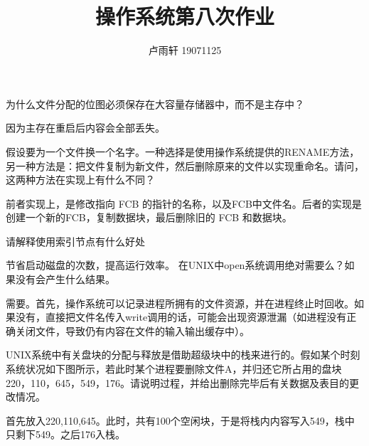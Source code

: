 \documentclass{ctexart}
\title{操作系统第八次作业}
\author{卢雨轩 19071125}
\begin{document}
\maketitle

\begin{outline}[enumerate]
    \1 为什么文件分配的位图必须保存在大容量存储器中，而不是主存中？

        因为主存在重启后内容会全部丢失。

    \1 假设要为一个文件换一个名字。一种选择是使用操作系统提供的RENAME方法，另一种方法是：把文件复制为新文件，然后删除原来的文件以实现重命名。请问，这两种方法在实现上有什么不同？ 

        前者实现上，是修改指向 FCB 的指针的名称，以及FCB中文件名。后者的实现是创建一个新的FCB，复制数据块，最后删除旧的 FCB 和数据块。

    \1 请解释使用索引节点有什么好处

        节省启动磁盘的次数，提高运行效率。
    \1 在UNIX中open系统调用绝对需要么？如果没有会产生什么结果。

        需要。首先，操作系统可以记录进程所拥有的文件资源，并在进程终止时回收。如果没有，直接把文件名传入write调用的话，可能会出现资源泄漏（如进程没有正确关闭文件，导致仍有内容在文件的输入输出缓存中）。

    \begin{minipage}[b]{0.7\textwidth}
        \1 UNIX系统中有关盘块的分配与释放是借助超级块中的栈来进行的。假如某个时刻系统状况如下图所示，若此时某个进程要删除文件A，并归还它所占用的盘块220，110，645，549，176。请说明过程，并给出删除完毕后有关数据及表目的更改情况。

        首先放入220,110,645。此时，共有100个空闲块，于是将栈内内容写入549，栈中只剩下549。之后176入栈。
        

\end{minipage}
\end{outline}
\end{document}
